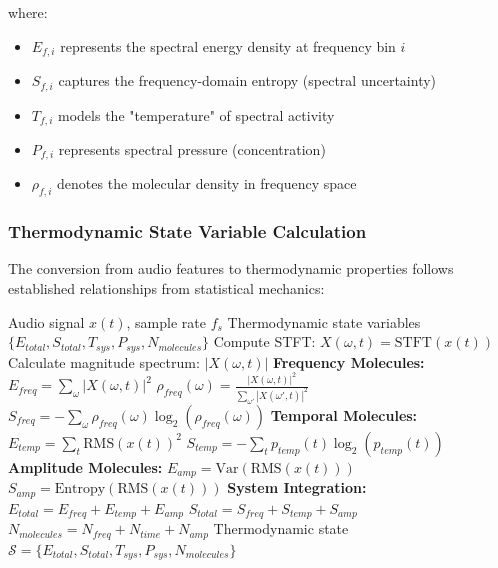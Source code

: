 where:
\begin{itemize}
\item $E_{f,i}$ represents the spectral energy density at frequency bin $i$
\item $S_{f,i}$ captures the frequency-domain entropy (spectral uncertainty)
\item $T_{f,i}$ models the "temperature" of spectral activity
\item $P_{f,i}$ represents spectral pressure (concentration)
\item $\rho_{f,i}$ denotes the molecular density in frequency space
\end{itemize}

\subsubsection{Thermodynamic State Variable Calculation}

The conversion from audio features to thermodynamic properties follows established relationships from statistical mechanics:

\begin{algorithm}[H]
\caption{Audio-to-Thermodynamic State Conversion}
\begin{algorithmic}[1]
\REQUIRE Audio signal $x(t)$, sample rate $f_s$
\ENSURE Thermodynamic state variables $\{E_{total}, S_{total}, T_{sys}, P_{sys}, N_{molecules}\}$
\STATE Compute STFT: $X(\omega, t) = \text{STFT}(x(t))$
\STATE Calculate magnitude spectrum: $|X(\omega, t)|$
\STATE \textbf{Frequency Molecules:}
\STATE $E_{freq} = \sum_{\omega} |X(\omega, t)|^2$ 
\STATE $\rho_{freq}(\omega) = \frac{|X(\omega, t)|^2}{\sum_{\omega'} |X(\omega', t)|^2}$ 
\STATE $S_{freq} = -\sum_{\omega} \rho_{freq}(\omega) \log_2(\rho_{freq}(\omega))$ 
\STATE \textbf{Temporal Molecules:}
\STATE $E_{temp} = \sum_{t} \text{RMS}(x(t))^2$ 
\STATE $S_{temp} = -\sum_{t} p_{temp}(t) \log_2(p_{temp}(t))$ 
\STATE \textbf{Amplitude Molecules:}
\STATE $E_{amp} = \text{Var}(\text{RMS}(x(t)))$ 
\STATE $S_{amp} = \text{Entropy}(\text{RMS}(x(t)))$ 
\STATE \textbf{System Integration:}
\STATE $E_{total} = E_{freq} + E_{temp} + E_{amp}$
\STATE $S_{total} = S_{freq} + S_{temp} + S_{amp}$
\STATE $N_{molecules} = N_{freq} + N_{time} + N_{amp}$
\RETURN Thermodynamic state $\mathcal{S} = \{E_{total}, S_{total}, T_{sys}, P_{sys}, N_{molecules}\}$
\end{algorithmic}
\end{algorithm}

